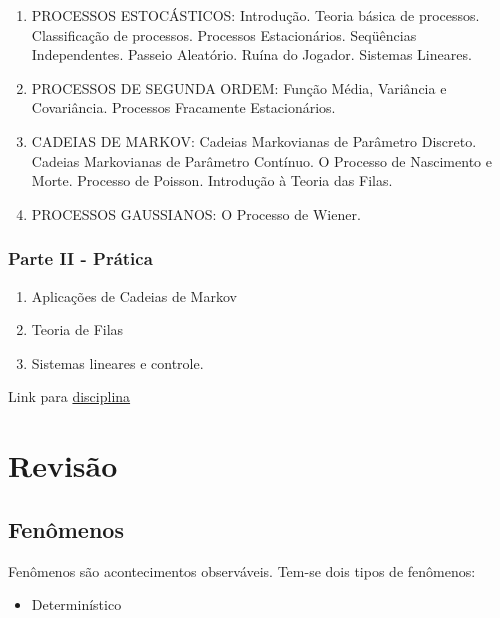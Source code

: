 \documentclass[]{article}
\providecommand{\tightlist}{%
  \setlength{\itemsep}{0pt}\setlength{\parskip}{0pt}}
\theoremstyle{definition}
\theoremstyle{definition}
\theoremstyle{definition}
\theoremstyle{remark}
\begin{document}
\begin{enumerate}
\def\labelenumi{\arabic{enumi}.}
\tightlist
\item
  PROCESSOS ESTOCÁSTICOS: Introdução. Teoria básica de processos.
  Classificação de processos. Processos Estacionários. Seqüências
  Independentes. Passeio Aleatório. Ruína do Jogador. Sistemas Lineares.
\item
  PROCESSOS DE SEGUNDA ORDEM: Função Média, Variância e Covariância.
  Processos Fracamente Estacionários.
\item
  CADEIAS DE MARKOV: Cadeias Markovianas de Parâmetro Discreto. Cadeias
  Markovianas de Parâmetro Contínuo. O Processo de Nascimento e Morte.
  Processo de Poisson. Introdução à Teoria das Filas.
\item
  PROCESSOS GAUSSIANOS: O Processo de Wiener.
\end{enumerate}

\subsubsection*{Parte II - Prática}\label{parte-ii---pratica}

\begin{enumerate}
\def\labelenumi{\arabic{enumi}.}
\setcounter{enumi}{4}
\tightlist
\item
  Aplicações de Cadeias de Markov
\item
  Teoria de Filas
\item
  Sistemas lineares e controle.
\end{enumerate}

Link para
\href{https://docs.ufpr.br/~benitoag/ce222-2018.html}{disciplina}

\section{Revisão}\label{revisao}

\subsection{Fenômenos}\label{fenomenos}

Fenômenos são acontecimentos observáveis. Tem-se dois tipos de
fenômenos:

\begin{itemize}
\tightlist
\item
  Determinístico
\end{itemize}
\end{document}

